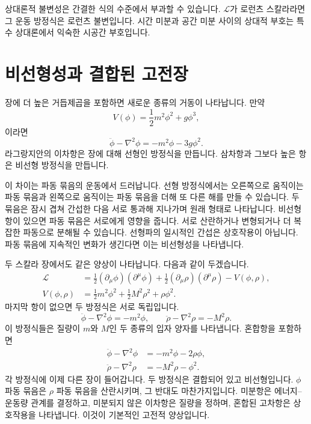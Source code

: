 상대론적 불변성은 간결한 식의 수준에서 부과할 수 있습니다. \(\mathcal L\)가 로런츠 스칼라라면 그 운동 방정식은 로런츠 불변입니다. 시간 미분과 공간 미분 사이의 상대적 부호는 특수 상대론에서 익숙한 시공간 부호입니다.

\section{비선형성과 결합된 고전장}

장에 더 높은 거듭제곱을 포함하면 새로운 종류의 거동이 나타납니다. 만약
\begin{equation}
V(\phi)=\frac12m^2\phi^2+g\phi^3,
\end{equation}
이라면
\begin{equation}
\ddot\phi-\nabla^2\phi=-m^2\phi-3g\phi^2.
\end{equation}
라그랑지안의 이차항은 장에 대해 선형인 방정식을 만듭니다. 삼차항과 그보다 높은 항은 비선형 방정식을 만듭니다.

이 차이는 파동 묶음의 운동에서 드러납니다. 선형 방정식에서는 오른쪽으로 움직이는 파동 묶음과 왼쪽으로 움직이는 파동 묶음을 더해 또 다른 해를 만들 수 있습니다. 두 묶음은 잠시 겹쳐 간섭한 다음 서로 통과해 지나가며 원래 형태로 나타납니다. 비선형 항이 있으면 파동 묶음은 서로에게 영향을 줍니다. 서로 산란하거나 변형되거나 더 복잡한 파동으로 분해될 수 있습니다. 선형파의 일시적인 간섭은 상호작용이 아닙니다. 파동 묶음에 지속적인 변화가 생긴다면 이는 비선형성을 나타냅니다.

두 스칼라 장에서도 같은 양상이 나타납니다. 다음과 같이 두겠습니다.
\begin{align}
\mathcal L
&=
\frac12(\partial_\mu\phi)(\partial^\mu\phi)
+\frac12(\partial_\mu\rho)(\partial^\mu\rho)
-V(\phi,\rho),
\\
V(\phi,\rho)
&=
\frac12m^2\phi^2+\frac12M^2\rho^2+\rho\phi^2.
\end{align}
마지막 항이 없으면 두 방정식은 서로 독립입니다.
\begin{equation}
\ddot\phi-\nabla^2\phi=-m^2\phi,
\qquad
\ddot\rho-\nabla^2\rho=-M^2\rho.
\end{equation}
이 방정식들은 질량이 \(m\)와 \(M\)인 두 종류의 입자 양자를 나타냅니다. 혼합항을 포함하면
\begin{align}
\ddot\phi-\nabla^2\phi&=-m^2\phi-2\rho\phi,
\\
\ddot\rho-\nabla^2\rho&=-M^2\rho-\phi^2.
\end{align}
각 방정식에 이제 다른 장이 들어갑니다. 두 방정식은 결합되어 있고 비선형입니다. \(\phi\) 파동 묶음은 \(\rho\) 파동 묶음을 산란시키며, 그 반대도 마찬가지입니다. 미분항은 에너지--운동량 관계를 결정하고, 미분되지 않은 이차항은 질량을 정하며, 혼합된 고차항은 상호작용을 나타냅니다. 이것이 기본적인 고전적 양상입니다.

